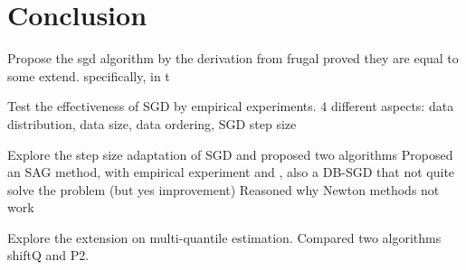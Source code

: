 \chapter{Conclusion}
\label{ch: conclusion}

Propose the sgd algorithm by the derivation from frugal 
proved they are equal to some extend. specifically, in t

Test the effectiveness of SGD by empirical experiments. 
4 different aspects: data distribution, data size, data ordering, SGD step size

Explore the step size adaptation of SGD and proposed two algorithms
Proposed an SAG method, with empirical experiment and , also a DB-SGD that not quite solve the problem (but yes improvement)
Reasoned why Newton methods not work

Explore the extension on multi-quantile estimation. Compared two algorithms shiftQ and P2.


